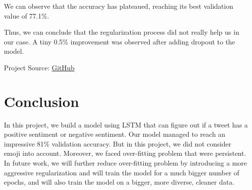 \documentclass{article}
\begin{document}
We can observe that the accuracy has plateaued, reaching its best validation value of 77.1\%.

Thus, we can conclude that the regularization process did not really help us in our case. A tiny 0.5\% improvement was observed after adding dropout to the model.

Project Source: \href{https://github.com/SakibFarhad/DeepLearningProject}{GitHub}

\section{Conclusion}
In this project, we build a model using LSTM that can figure out if a tweet has a positive sentiment or negative sentiment. Our model managed to reach an impressive 81\% validation accuracy. But in this project, we did not consider emoji into account. Moreover, we faced over-fitting problem that were persistent. In future work, we will further reduce over-fitting problem by introducing a more aggressive regularization and will train the model for a much bigger number of epochs, and will also train the model on a bigger, more diverse, cleaner data.



\end{document}
